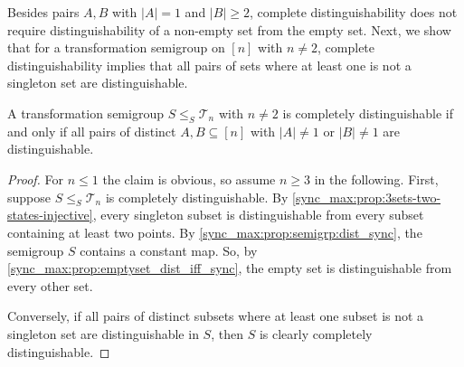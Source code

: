 Besides pairs $A,B$ with $|A| = 1$ and $|B| \ge 2$,
complete distinguishability does not require distinguishability of a non-empty set from the empty set.
% 
Next, we show that for a transformation semigroup on $[n]$
with $n \ne 2$, complete distinguishability
implies that all pairs of sets where at least one
is not a singleton set are distinguishable.

\begin{proposition}
	A transformation semigroup $S \le_S \mathcal T_n$ with $n \ne 2$
	is completely distinguishable if and only if 
    all pairs of distinct $A, B \subseteq [n]$
	with $|A| \ne 1$ or $|B| \ne 1$
	are distinguishable.	
\end{proposition}
\begin{proof}
	For $n \le 1$ the claim is obvious, so assume $n \ge 3$ in the following.
	First, suppose $S \le_S \mathcal T_n$ is completely distinguishable.
	By \cref{sync_max:prop:3sets-two-states-injective},
	every singleton subset is distinguishable from every
	subset containing at least two points.
	By \cref{sync_max:prop:semigrp:dist_sync},
	the semigroup $S$ contains a constant map. So, by \cref{sync_max:prop:emptyset_dist_iff_sync},
	the empty set is distinguishable from every
	other set.	   
	  
    Conversely, if all pairs of distinct subsets
    where at least one subset is not a singleton set are distinguishable in $S$,
    then $S$ is clearly completely distinguishable.
\end{proof}